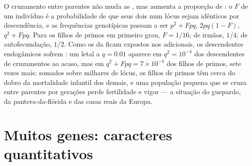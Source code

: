 \begin{proposition}[Endogamia]\label{prop:b2:population-genetics:inbreeding}
O cruzamento entre parentes não muda as , mas
aumenta a proporção de : o \emph{}
$F$ de um indivíduo é a probabilidade de que seus dois  num lócus
sejam idênticos por descendência, e as frequências genotípicas passam a
ser $p^{2} + Fpq$, $2pq(1 - F)$, $q^{2} + Fpq$. Para os filhos de primos
em primeiro grau, $F = 1/16$; de irmãos, $1/4$; de autofecundação,
$1/2$. Como os   da  ficam expostos nos
 adicionais, os descendentes endogâmicos sofrem
\emph{}: um  letal a $q = 0.01$
aparece em $q^{2} = 10^{-4}$ dos descendentes de cruzamentos ao acaso, mas em
$q^{2} + Fpq = 7\times 10^{-4}$ dos filhos de primos, sete vezes mais;
somados sobre milhares de lócus, os filhos de primos têm cerca do dobro
da mortalidade infantil dos demais, e uma população pequena que se
cruza entre parentes por gerações perde fertilidade e vigor --- a
situação do guepardo, da pantera-da-flórida e das casas reais da Europa.
\end{proposition}

\section{Muitos genes: caracteres quantitativos}

